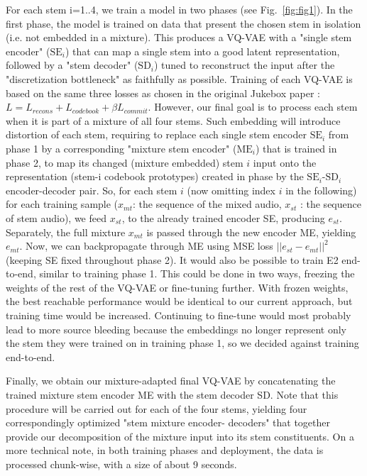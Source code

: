 \documentclass{llncs}
\begin{document}
For each stem i=1..4, we train a model in two phases (see Fig.~\ref{fig:fig1}). In
the first phase, the model is trained on data that present the chosen
stem in isolation (i.e. not embedded in a mixture). This produces a
VQ-VAE with a "single stem encoder" ($\text{SE}_i$) that can map a single
stem into a good latent representation, followed by a "stem decoder"
($\text{SD}_i$)  tuned  to  reconstruct  the  input  after  the  "discretization
bottleneck" as faithfully as possible. Training of each VQ-VAE is based
on the same three losses as chosen in the original Jukebox paper
\cite{dhariwal2020jukebox} : $L = L_{recons} + L_{codebook} + \beta L_{commit}$. However, our
final goal is to process each stem when it is part of a mixture of all
four stems. Such embedding will introduce distortion of each stem,
requiring to replace each single stem encoder $\text{SE}_i$ from phase 1 by a
corresponding "mixture stem encoder" ($\text{ME}_i$) that is trained in phase
2, to map its changed (mixture embedded) stem $
i$ input onto the representation (stem-i codebook prototypes) created
in phase by the $\text{SE}_{i}$-$\text{SD}_i$ encoder-decoder pair. So, for each stem $i$
(now omitting index $i$ in the following) for each training sample ($x_{mt}$:
the sequence of the mixed audio, $ x_{st}$ : the sequence of stem audio),
we feed  $x_{st}$, to  the  already  trained  encoder SE,  producing  $e_{st}$.
Separately, the full mixture $x_{mt}$ is passed through the new encoder
ME, yielding $e_{mt}$. Now, we can backpropagate through ME using MSE
loss $||e_{st}-e_{mt}||^2$ (keeping SE fixed throughout phase 2). 
It would also be possible to train E2 end-to-end, similar to training phase 1. This could be done in two ways, freezing the weights of the rest of the VQ-VAE or fine-tuning further. With frozen weights, the best reachable performance would be identical to our current approach, but training time
would be increased. Continuing to fine-tune would most probably lead to more source bleeding because the embeddings no longer represent only the stem they were trained on in training phase 1, so we decided against training end-to-end.





Finally, we
obtain  our  mixture-adapted  final  VQ-VAE  by  concatenating  the
trained mixture stem encoder ME with the stem decoder SD. Note
that this procedure will be carried out for each of the four stems,
yielding  four correspondingly optimized  "stem  mixture  encoder-
decoders" that together provide our decomposition of the mixture input into its stem constituents. On a more technical note, in both training phases and deployment, the data is processed chunk-wise, with a size of about 9 seconds.
\end{document}
